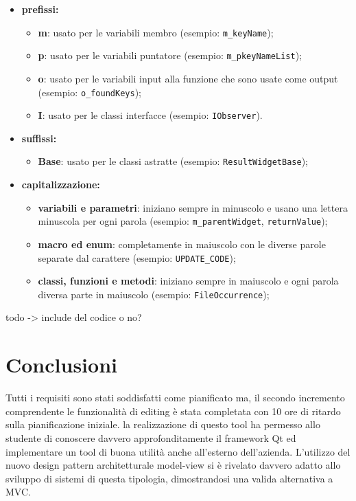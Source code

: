 \begin{itemize}
	\item \textbf{prefissi:}
	\begin{itemize}
		\item \textbf{m}: usato per le variabili membro (esempio: \texttt{m\_keyName});
		\item \textbf{p}: usato per le variabili puntatore (esempio: \texttt{m\_pkeyNameList});
		\item \textbf{o}: usato per le variabili input alla funzione che sono usate come output (esempio: \texttt{o\_foundKeys});
		\item \textbf{I}: usato per le classi interfacce (esempio: \texttt{IObserver}).
	\end{itemize}
	\item \textbf{suffissi:}
	\begin{itemize}
		\item \textbf{Base}: usato per le classi astratte (esempio: \texttt{ResultWidgetBase});
	\end{itemize}
	\item \textbf{capitalizzazione:}
	\begin{itemize}
		\item \textbf{variabili e parametri}: iniziano sempre in minuscolo e usano una lettera minuscola per ogni parola (esempio: \texttt{m\_parentWidget}, \texttt{returnValue});
		\item \textbf{macro ed enum}: completamente in maiuscolo con le diverse parole separate dal carattere \sq{\_} (esempio: \texttt{UPDATE\_CODE});
		\item \textbf{classi, funzioni e metodi}: iniziano sempre in maiuscolo e ogni parola diversa parte in maiuscolo (esempio: \texttt{FileOccurrence});
	\end{itemize}
\end{itemize}

todo -> include del codice o no?

\section{Conclusioni}
Tutti i requisiti sono stati soddisfatti come pianificato ma, il secondo incremento comprendente le funzionalità di editing è stata completata con 10 ore di ritardo sulla pianificazione iniziale. 
la realizzazione di questo tool ha permesso allo studente di conoscere davvero approfonditamente il framework Qt ed implementare un tool di buona utilità anche all'esterno dell'azienda. L'utilizzo del nuovo design pattern architetturale model-view si è rivelato davvero adatto allo sviluppo di sistemi di questa tipologia, dimostrandosi una valida alternativa a MVC.
